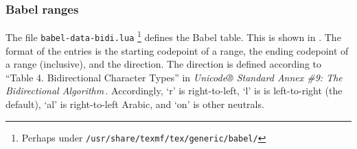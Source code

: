 \documentclass[12pt, twoside]{article}
\begin{document}
\subsubsection{Babel ranges}

The file \texttt{babel-data-bidi.lua} \footnote{Perhaps under \texttt{/usr/share/texmf/tex/generic/babel/}} defines the Babel table. This is shown in . The format of the entries is the starting codepoint of a range, the ending codepoint of a range (inclusive), and the direction. The direction is defined according to ``Table 4. Bidirectional Character Types'' in \textit{Unicode® Standard Annex \#9: The Bidirectional Algorithm}\,\cite{UAX9}. Accordingly, `r' is right-to-left, `l' is is left-to-right (the default), `al' is right-to-left Arabic, and `on' is other neutrals.
\end{document}

